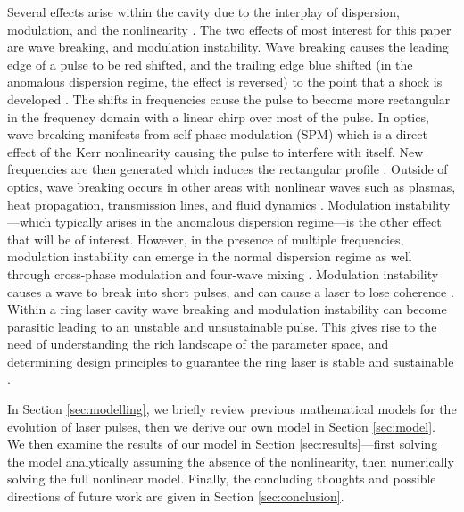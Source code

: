 \documentclass[9pt,twocolumn,twoside]{osajnl}
\begin{document}
Several effects arise within the cavity due to the interplay of dispersion, modulation, and the nonlinearity \cite{bohun2015, coen1997, lapre2019, shao2019, woodward2018}. The two effects of most interest for this paper are wave breaking, and modulation instability. Wave breaking causes the leading edge of a pulse to be red shifted, and the trailing edge blue shifted (in the anomalous dispersion regime, the effect is reversed) to the point that a shock is developed \cite{anderson1992, rothenberg1989a, rothenberg1989b, tomlinson1984, tomlinson1985}. The shifts in frequencies cause the pulse to become more rectangular in the frequency domain with a linear chirp over most of the pulse. In optics, wave breaking manifests from self-phase modulation (SPM) which is a direct effect of the Kerr nonlinearity causing the pulse to interfere with itself. New frequencies are then generated which induces the rectangular profile \cite{agrawal2013, mollenauer1980, woodward2018}. Outside of optics, wave breaking occurs in other areas with nonlinear waves such as plasmas, heat propagation, transmission lines, and fluid dynamics \cite{rothenberg1989b}. Modulation instability---which typically arises in the anomalous dispersion regime---is the other effect that will be of interest. However, in the presence of multiple frequencies, modulation instability can emerge in the normal dispersion regime as well through cross-phase modulation and four-wave mixing \cite{agrawal1987, agrawal1989, agrawal2013, haelterman1992}. Modulation instability causes a wave to break into short pulses, and can cause a laser to lose coherence \cite{agrawal1987, coen1997, haelterman1992}. Within a ring laser cavity wave breaking and modulation instability can become parasitic leading to an unstable and unsustainable pulse. This gives rise to the need of understanding the rich landscape of the parameter space, and determining design principles to guarantee the ring laser is stable and sustainable \cite{bohun2015, burgoyneemail, finot2008, lapre2019, woodward2018}.

In Section \ref{sec:modelling}, we briefly review previous mathematical models for the evolution of laser pulses, then we derive our own model in Section \ref{sec:model}. We then examine the results of our model in Section \ref{sec:results}---first solving the model analytically assuming the absence of the nonlinearity, then numerically solving the full nonlinear model. Finally, the concluding thoughts and possible directions of future work are given in Section \ref{sec:conclusion}.
\end{document}
